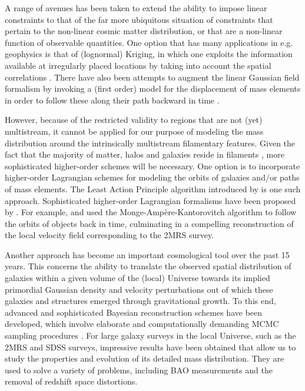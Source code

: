 \documentclass[a4paper, 11pt]{article}
\begin{document}
A range of avenues has been taken to extend the ability to impose linear constraints to that of the far more ubiquitous situation of constraints that pertain to the non-linear cosmic matter distribution, or that are a non-linear function of observable quantities. One option that has many applications in e.g. geophysics is that of (lognormal) Kriging, in which one exploits the information available at irregularly placed locations by taking into account the spatial correlations \cite{Platen:2011}. There have also been attempts to augment the linear Gaussian field formalism by invoking a (first order) model for the displacement of mass elements in order to follow these along their path backward in time \citep{Doumler:2013}.

However, because of the restricted validity to regions that are not (yet) multistream, it cannot be applied for our purpose of modeling the mass distribution around the intrinsically multistream filamentary features. Given the fact that the majority of matter, halos and galaxies reside in filaments \citep{Cautun:2014,Ganeshaiah:2019}, more sophisticated higher-order schemes will be necessary. One option is to incorporate higher-order Lagrangian schemes for modeling the orbits of galaxies and/or paths of mass elements. The Least Action Principle algorithm introduced by \cite{Peebles:1989} is one such approach. Sophisticated higher-order Lagrangian formalisms have been proposed by \cite{Mohayaee:2006, Lavaux:2008, Hada:2018, Shi:2018, Zhu:2018}. For example, \cite{Mohayaee:2006} and \cite{Lavaux:2008} used the Monge-Amp\`ere-Kantorovitch algorithm to follow the orbits of objects back in time, culminating in a compelling reconstruction of the local velocity field corresponding to the 2MRS survey. 

Another approach has become an important cosmological tool over the past 15 years. This concerns the ability to translate the observed spatial distribution of galaxies within a given volume of the (local) Universe towards its implied primordial Gaussian density and velocity perturbations out of which these galaxies and structures emerged through gravitational growth. To this end, advanced and sophisticated Bayesian reconstruction schemes have been developed, which involve elaborate and computationally demanding  MCMC sampling procedures \cite{Kitaura:2008,Kitaura:2009, Jasche:2010,Leclercq:2015,Hess:2016, Bos:2016, Leclercq:2017, McAlpine:2022}. For large galaxy surveys in the local Universe, such as the 2MRS and SDSS surveys, impressive results have been obtained that allow us to study the properties and evolution of its detailed mass distribution. They are used to solve a variety of problems, including BAO measurements and the removal of redshift space distortions. 
\end{document}

